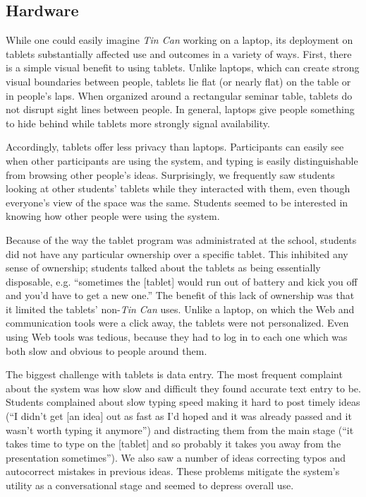 

\subsection{Hardware}

While one could easily imagine \emph{Tin Can} working on a laptop, its deployment on tablets substantially affected use and outcomes in a variety of ways. First, there is a simple visual benefit to using tablets. Unlike laptops, which can create strong visual boundaries between people, tablets lie flat (or nearly flat) on the table or in people's laps. When organized around a rectangular seminar table, tablets do not disrupt sight lines between people. In general, laptops give people something to hide behind while tablets more strongly signal availability.

Accordingly, tablets offer less privacy than laptops. Participants can easily see when other participants are using the system, and typing is easily distinguishable from browsing other people's ideas. Surprisingly, we frequently saw students looking at other students' tablets while they interacted with them, even though everyone's view of the space was the same. Students seemed to be interested in knowing how other people were using the system. 

Because of the way the tablet program was administrated at the school, students did not have any particular ownership over a specific tablet. This inhibited any sense of ownership; students talked about the tablets as being essentially disposable, e.g. ``sometimes the [tablet] would run out of battery and kick you off and you'd have to get a new one.'' The benefit of this lack of ownership was that it limited the tablets' non-\emph{Tin Can} uses. Unlike a laptop, on which the Web and communication tools were a click away, the tablets were not personalized. Even using Web tools was tedious, because they had to log in to each one which was both slow and obvious to people around them. 

The biggest challenge with tablets is data entry. The most frequent complaint about the system was how slow and difficult they found accurate text entry to be. Students complained about slow typing speed making it hard to post timely ideas (``I didn't get [an idea] out as fast as I'd hoped and it was already passed and it wasn't worth typing it anymore'') and distracting them from the main stage (``it takes time to type on the [tablet] and so probably it takes you away from the presentation sometimes''). We also saw a number of ideas correcting typos and autocorrect mistakes in previous ideas. These problems mitigate the system's utility as a conversational stage and seemed to depress overall use.


